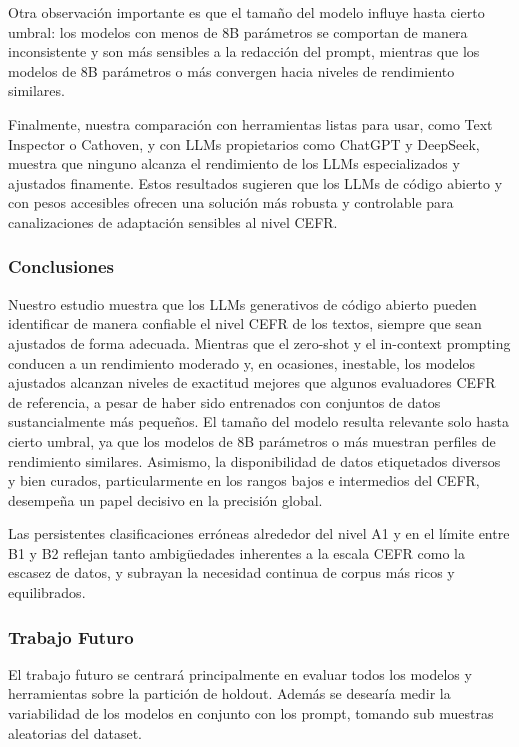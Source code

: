 Otra observación importante es que el tamaño del modelo influye hasta cierto umbral: los modelos con menos de 8B parámetros se comportan de manera inconsistente y son más sensibles a la redacción del prompt, mientras que los modelos de 8B parámetros o más convergen hacia niveles de rendimiento similares.

Finalmente, nuestra comparación con herramientas listas para usar, como Text Inspector o Cathoven, y con LLMs propietarios como ChatGPT y DeepSeek, muestra que ninguno alcanza el rendimiento de los LLMs especializados y ajustados finamente. Estos resultados sugieren que los LLMs de código abierto y con pesos accesibles ofrecen una solución más robusta y controlable para canalizaciones de adaptación sensibles al nivel CEFR.

\subsubsection{Conclusiones}

Nuestro estudio muestra que los LLMs generativos de código abierto pueden identificar de manera confiable el nivel CEFR de los textos, siempre que sean ajustados de forma adecuada. Mientras que el zero-shot y el in-context prompting conducen a un rendimiento moderado y, en ocasiones, inestable, los modelos ajustados alcanzan niveles de exactitud mejores que algunos evaluadores CEFR de referencia, a pesar de haber sido entrenados con conjuntos de datos sustancialmente más pequeños. El tamaño del modelo resulta relevante solo hasta cierto umbral, ya que los modelos de 8B parámetros o más muestran perfiles de rendimiento similares. Asimismo, la disponibilidad de datos etiquetados diversos y bien curados, particularmente en los rangos bajos e intermedios del CEFR, desempeña un papel decisivo en la precisión global.

Las persistentes clasificaciones erróneas alrededor del nivel A1 y en el límite entre B1 y B2 reflejan tanto ambigüedades inherentes a la escala CEFR como la escasez de datos, y subrayan la necesidad continua de corpus más ricos y equilibrados.

\subsubsection{Trabajo Futuro}

El trabajo futuro se centrará principalmente en evaluar todos los modelos y herramientas sobre la partición de holdout. Además se desearía medir la variabilidad de los modelos en conjunto con los prompt, tomando sub muestras aleatorias del dataset.

